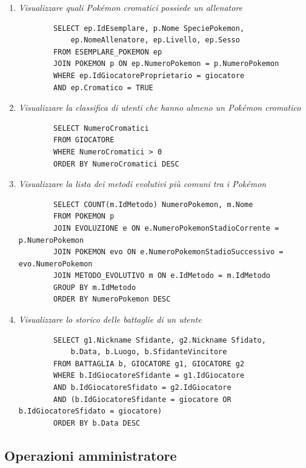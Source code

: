 \documentclass[a4paper,12pt]{report}
\begin{document}
\begin{enumerate}
	\item \textit{Visualizzare quali Pokémon cromatici possiede un allenatore}
	\begin{verbatim}
		SELECT ep.IdEsemplare, p.Nome SpeciePokemon,
			ep.NomeAllenatore, ep.Livello, ep.Sesso
		FROM ESEMPLARE_POKEMON ep
		JOIN POKEMON p ON ep.NumeroPokemon = p.NumeroPokemon
		WHERE ep.IdGiocatoreProprietario = giocatore 
		AND ep.Cromatico = TRUE
	\end{verbatim}
	
	\item \textit{Visualizzare la classifica di utenti che hanno almeno un Pokémon cromatico}
	\begin{verbatim}
		SELECT NumeroCromatici
		FROM GIOCATORE
		WHERE NumeroCromatici > 0
		ORDER BY NumeroCromatici DESC
	\end{verbatim}
	
	\item \textit{Visualizzare la lista dei metodi evolutivi più comuni tra i Pokémon}
	\begin{verbatim}
		SELECT COUNT(m.IdMetodo) NumeroPokemon, m.Nome
		FROM POKEMON p
		JOIN EVOLUZIONE e ON e.NumeroPokemonStadioCorrente = p.NumeroPokemon
		JOIN POKEMON evo ON e.NumeroPokemonStadioSuccessivo = evo.NumeroPokemon
		JOIN METODO_EVOLUTIVO m ON e.IdMetodo = m.IdMetodo
		GROUP BY m.IdMetodo
		ORDER BY NumeroPokemon DESC
	\end{verbatim}	
		
	\item \textit{Visualizzare lo storico delle battaglie di un utente}
	\begin{verbatim}
		SELECT g1.Nickname Sfidante, g2.Nickname Sfidato,
			b.Data, b.Luogo, b.SfidanteVincitore
		FROM BATTAGLIA b, GIOCATORE g1, GIOCATORE g2
		WHERE b.IdGiocatoreSfidante = g1.IdGiocatore
		AND b.IdGiocatoreSfidato = g2.IdGiocatore
		AND (b.IdGiocatoreSfidante = giocatore OR b.IdGiocatoreSfidato = giocatore)
		ORDER BY b.Data DESC
	\end{verbatim}
\end{enumerate}

\subsection{Operazioni amministratore}
\end{document}
